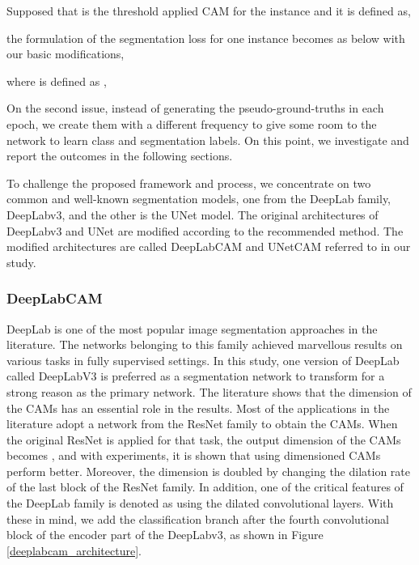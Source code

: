 \documentclass[sn-mathphys]{sn-jnl}
\theoremstyle{thmstyleone}
\theoremstyle{thmstyletwo}\newtheorem{example}{Example}\newtheorem{remark}{Remark}
\theoremstyle{thmstylethree}\newtheorem{definition}{Definition}
\begin{document}
Supposed that  is the threshold applied CAM for the instance  and it is defined as,








the formulation of the segmentation loss for one instance becomes as below with our basic modifications,

where  is defined as ,



On the second issue, instead of generating the pseudo-ground-truths in each epoch, we create them with a different frequency to give some room to the network to learn class and segmentation labels. On this point, we investigate and report the outcomes in the following sections.

To challenge the proposed framework and process, we concentrate on two common and well-known segmentation models, one from the DeepLab family, DeepLabv3, and the other is the UNet model. The original architectures of DeepLabv3 and UNet are modified according to the recommended method. The modified architectures are called DeepLabCAM and UNetCAM referred to in our study.


\subsubsection{DeepLabCAM}

DeepLab is one of the most popular image segmentation approaches in the literature. The networks belonging to this family achieved marvellous results on various tasks in fully supervised settings. In this study, one version of DeepLab called DeepLabV3 is preferred as a segmentation network to transform for a strong reason as the primary network. The literature shows that the dimension of the CAMs has an essential role in the results. Most of the applications in the literature adopt a network from the ResNet family to obtain the CAMs. When the original ResNet is applied for that task, the output dimension of the CAMs becomes , and with experiments, it is shown that using  dimensioned CAMs perform better.
Moreover, the dimension is doubled by changing the dilation rate of the last block of the ResNet family. In addition, one of the critical features of the DeepLab family is denoted as using the dilated convolutional layers. With these in mind, we add the classification branch after the fourth convolutional block of the encoder part of the DeepLabv3, as shown in  Figure \ref{deeplabcam_architecture}.
\end{document}
